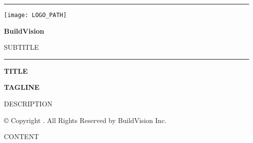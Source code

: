 \documentclass[11pt]{article}
\begin{document}
\begin{titlepage}
  \noindent\textcolor{bvPrimary}{\rule{\textwidth}{15pt}}
  
  \vspace{2cm}
  
  \texttt{[image: LOGO\_PATH]}
  
  \vspace{2cm}
  
  {\fontsize{24}{28}\selectfont\textcolor{bvPrimary}{\textbf{BuildVision}}\par}
  {\fontsize{24}{28}\selectfont\textcolor{bvTextPrimary}{SUBTITLE}\par}
  
  \vspace{0.5cm}
  \noindent\textcolor{bvPrimary}{\rule{10cm}{2pt}}
  
  \vspace{1cm}
  {\fontsize{18}{22}\selectfont\textcolor{bvTextPrimary}{\textbf{TITLE}}\par}
  
  \vspace{0.7cm}
  {\fontsize{14}{18}\selectfont\textcolor{bvPrimaryDark}{\textbf{TAGLINE}}\par}
  
  \vspace{0.3cm}
  {\fontsize{11}{15}\selectfont\textcolor{bvTextSecondary}{DESCRIPTION}\par}
  
  \vfill
  {\fontsize{9}{11}\selectfont\textcolor{bvTextTertiary}{© Copyright \the\year. All Rights Reserved by BuildVision Inc.}\par}
\end{titlepage}

CONTENT
\end{document}
